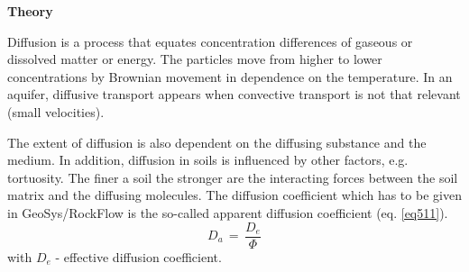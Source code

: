 
\textbf{Theory}

Diffusion is a process that equates concentration differences of gaseous or dissolved matter or energy. The particles move from higher to lower concentrations by Brownian movement in dependence on the temperature. In an aquifer, diffusive transport appears when convective transport is not that relevant (small velocities).

The extent of diffusion is also dependent on the diffusing substance and the medium. In addition, diffusion in soils is influenced by other factors, e.g. tortuosity. The finer a soil the stronger are the interacting forces between the soil matrix and the diffusing molecules. The diffusion coefficient which has to be given in GeoSys/RockFlow is the so-called apparent diffusion coefficient (eq. \ref{eq511}).
\begin{equation}
D_a\,=\,\frac{D_e}{\Phi}
\label{eq511}
\end{equation}
{\small
with $D_e$ - effective diffusion coefficient.
}
